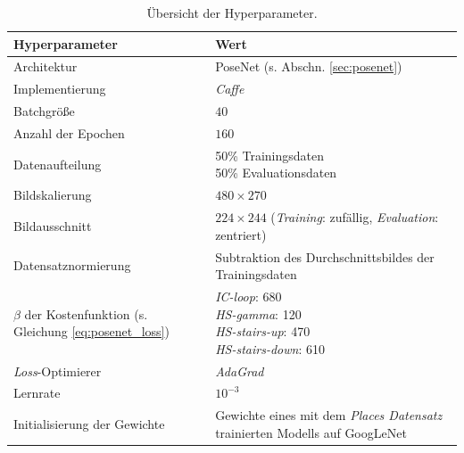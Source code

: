 \cleardoublepage
\begin{table}[bp]
	\centering
	\caption{Übersicht der Hyperparameter.}
	\begin{tabularx}{1.0\textwidth}{X X}
		\textbf{Hyperparameter} & \textbf{Wert}\\
		\hline
		Architektur & PoseNet (s. Abschn. \ref{sec:posenet})\\
		\hline
		Implementierung & \textit{Caffe} \\
		\hline
		Batchgröße & $40$\\
		\hline
		Anzahl der Epochen & $160$\\
		\hline
		Datenaufteilung & \makecell[tl]{
			50\% Trainingsdaten\\
			50\% Evaluationsdaten\\
		}\\
		\hline
		Bildskalierung & $480 \times 270$\\
		\hline
		Bildausschnitt& \makecell[tl]{
			$224 \times 244$\\
			(\textit{Training}: zufällig, \textit{Evaluation}: zentriert)\\
		}\\
		\hline
		Datensatznormierung & Subtraktion des Durchschnittsbildes der Trainingsdaten \\
		\hline
		\makecell[tl]{
			$\beta$ der Kostenfunktion\\
			(s. Gleichung \ref{eq:posenet_loss}) 
		} &
		\makecell[tl]{
			\textit{IC-loop}: 680\\
			\textit{HS-gamma}: 120\\
			\textit{HS-stairs-up}: 470\\
			\textit{HS-stairs-down}: 610\\
		}\\
		\hline
		\textit{Loss}-Optimierer & \textit{AdaGrad}\\
		\hline
		Lernrate & $10^{-3}$\\
		\hline
		Initialisierung der Gewichte & Gewichte eines mit dem \textit{Places Datensatz} trainierten Modells auf GoogLeNet \\
	\end{tabularx}
	\label{tab:trainingparams}
\end{table}
\cleardoublepage